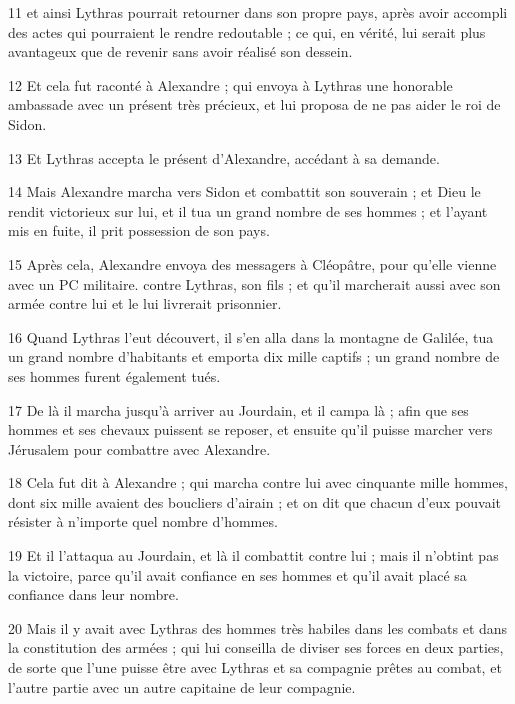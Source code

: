 \par 11 et ainsi Lythras pourrait retourner dans son propre pays, après avoir accompli des actes qui pourraient le rendre redoutable ; ce qui, en vérité, lui serait plus avantageux que de revenir sans avoir réalisé son dessein.

\par 12 Et cela fut raconté à Alexandre ; qui envoya à Lythras une honorable ambassade avec un présent très précieux, et lui proposa de ne pas aider le roi de Sidon.

\par 13 Et Lythras accepta le présent d'Alexandre, accédant à sa demande.

\par 14 Mais Alexandre marcha vers Sidon et combattit son souverain ; et Dieu le rendit victorieux sur lui, et il tua un grand nombre de ses hommes ; et l'ayant mis en fuite, il prit possession de son pays.

\par 15 Après cela, Alexandre envoya des messagers à Cléopâtre, pour qu'elle vienne avec un PC militaire. contre Lythras, son fils ; et qu'il marcherait aussi avec son armée contre lui et le lui livrerait prisonnier.

\par 16 Quand Lythras l'eut découvert, il s'en alla dans la montagne de Galilée, tua un grand nombre d'habitants et emporta dix mille captifs ; un grand nombre de ses hommes furent également tués.

\par 17 De là il marcha jusqu'à arriver au Jourdain, et il campa là ; afin que ses hommes et ses chevaux puissent se reposer, et ensuite qu'il puisse marcher vers Jérusalem pour combattre avec Alexandre.

\par 18 Cela fut dit à Alexandre ; qui marcha contre lui avec cinquante mille hommes, dont six mille avaient des boucliers d'airain ; et on dit que chacun d'eux pouvait résister à n'importe quel nombre d'hommes.

\par 19 Et il l'attaqua au Jourdain, et là il combattit contre lui ; mais il n'obtint pas la victoire, parce qu'il avait confiance en ses hommes et qu'il avait placé sa confiance dans leur nombre.

\par 20 Mais il y avait avec Lythras des hommes très habiles dans les combats et dans la constitution des armées ; qui lui conseilla de diviser ses forces en deux parties, de sorte que l'une puisse être avec Lythras et sa compagnie prêtes au combat, et l'autre partie avec un autre capitaine de leur compagnie.

